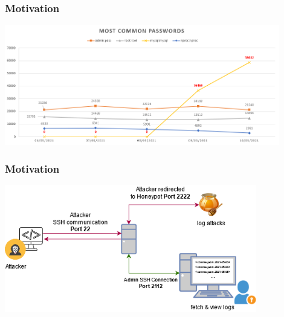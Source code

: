 \documentclass[11pt,t,usepdftitle=false,aspectratio=169]{beamer}
\begin{document}
\begin{frame}[fragile]
	\frametitle{Motivation}	
	\begin{center}
		\includegraphics[width=120mm]{_images/Visualization_Common_Passwords_Anomalie.png}
	\end{center}
\end{frame}

\begin{frame}
	\frametitle{Motivation}	
	\begin{center}
		\includegraphics[width=110mm]{_images/SSH_Overview.png}
	\end{center}
\end{frame}
\end{document}
